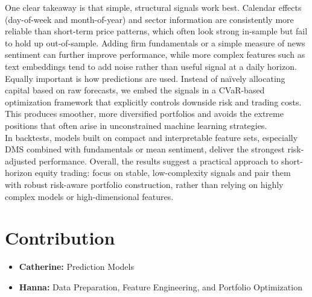 \documentclass[11pt]{article}
\begin{document}
\noindent One clear takeaway is that simple, structural signals work best. Calendar effects (day-of-week and month-of-year) and sector information are consistently more reliable than short-term price patterns, which often look strong in-sample but fail to hold up out-of-sample. Adding firm fundamentals or a simple measure of news sentiment can further improve performance, while more complex features such as text embeddings tend to add noise rather than useful signal at a daily horizon.\\

\noindent Equally important is how predictions are used. Instead of naïvely allocating capital based on raw forecasts, we embed the signals in a CVaR-based optimization framework that explicitly controls downside risk and trading costs. This produces smoother, more diversified portfolios and avoids the extreme positions that often arise in unconstrained machine learning strategies.\\

\noindent In backtests, models built on compact and interpretable feature sets, especially DMS combined with fundamentals or mean sentiment, deliver the strongest risk-adjusted performance. Overall, the results suggest a practical approach to short-horizon equity trading: focus on stable, low-complexity signals and pair them with robust risk-aware portfolio construction, rather than relying on highly complex models or high-dimensional features.\\


\section{Contribution}
\begin{itemize}
    \item \textbf{Catherine:}  
    Prediction Models 

    \item \textbf{Hanna:}  
    Data Preparation, Feature Engineering, and Portfolio Optimization
\end{itemize}


\end{document}
